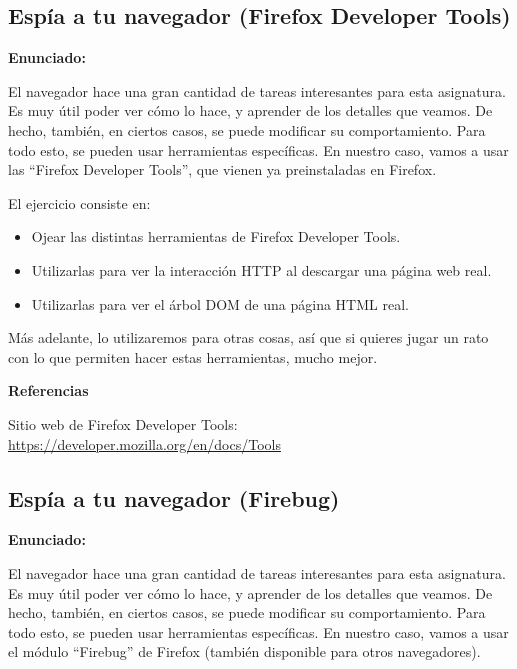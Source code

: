 \subsection{Espía a tu navegador (Firefox Developer Tools)}
\label{subsec:firefox-devel}

\textbf{Enunciado:}

El navegador hace una gran cantidad de tareas interesantes para esta asignatura. Es muy útil poder ver cómo lo hace, y aprender de los detalles que veamos. De hecho, también, en ciertos casos, se puede modificar su comportamiento. Para todo esto, se pueden usar herramientas específicas. En nuestro caso, vamos a usar las ``Firefox Developer Tools'', que vienen ya preinstaladas en Firefox.

El ejercicio consiste en:

\begin{itemize}
\item Ojear las distintas herramientas de Firefox Developer Tools.
\item Utilizarlas para ver la interacción HTTP al descargar una página web real.
\item Utilizarlas para ver el árbol DOM de una página HTML real.
\end{itemize}

Más adelante, lo utilizaremos para otras cosas, así que si quieres jugar un rato con lo que permiten hacer estas herramientas, mucho mejor.

\textbf{Referencias}

Sitio web de Firefox Developer Tools: \\
\url{https://developer.mozilla.org/en/docs/Tools}


\subsection{Espía a tu navegador (Firebug)}
\label{subsec:firebug}

\textbf{Enunciado:}

El navegador hace una gran cantidad de tareas interesantes para esta asignatura. Es muy útil poder ver cómo lo hace, y aprender de los detalles que veamos. De hecho, también, en ciertos casos, se puede modificar su comportamiento. Para todo esto, se pueden usar herramientas específicas. En nuestro caso, vamos a usar el módulo ``Firebug'' de Firefox (también disponible para otros navegadores).

